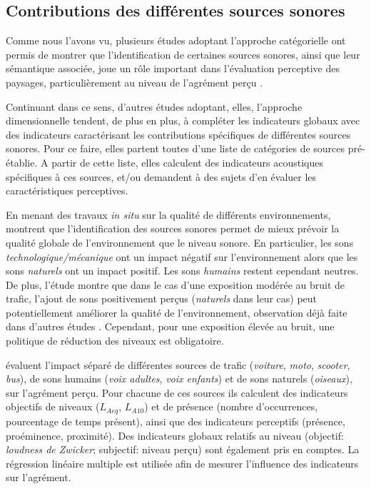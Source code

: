 \subsection{Contributions des différentes sources sonores}
\label{sec:ch3_contribSource}

Comme nous l'avons vu, plusieurs études adoptant l'approche catégorielle ont permis de montrer que l'identification de certaines sources sonores, ainsi que leur sémantique associée, joue un rôle important dans l'évaluation perceptive des paysages, particulièrement au niveau de l'agrément perçu \citep{defreville2004aactivity,guastavino2006ideal,nilsson2007soundscape,szeremeta2009analysis,gozalo2015relationship}.

Continuant dans ce sens, d'autres études adoptant, elles, l'approche dimensionnelle tendent, de plus en plus, à compléter les indicateurs globaux avec des indicateurs caractérisant les contributions spécifiques de différentes sources sonores. Pour ce faire, elles partent toutes d'une liste de catégories de sources pré-établie. A partir de cette liste, elles calculent des indicateurs acoustiques spécifiques à ces sources, et/ou demandent à des sujets d'en évaluer les caractéristiques perceptives.

En menant des travaux \emph{in situ} sur la qualité de différents environnements, \citep{nilsson2007acoustic,nilsson2007soundscape} montrent que l'identification des sources sonores permet de mieux prévoir la qualité globale de l'environnement que le niveau sonore. En particulier, les sons \emph{technologique/mécanique} ont un impact négatif sur l'environnement alors que les sons \emph{naturels} ont un impact positif. Les sons \emph{humains} restent cependant neutres. De plus, l'étude montre que dans le cas d'une exposition modérée au bruit de trafic, l'ajout de sons positivement perçus (\emph{naturels} dans leur cas) peut potentiellement améliorer la qualité de l'environnement, observation déjà faite dans d'autres études \citep{hong2013designing,galbrun2012perceptual}. Cependant, pour une exposition élevée au bruit, une politique de réduction des niveaux est obligatoire.

\citep{defreville2004aactivity,lavandier2006contribution} évaluent l'impact séparé de différentes sources de trafic (\emph{voiture}, \emph{moto}, \emph{scooter}, \emph{bus}), de sons humains (\emph{voix adultes}, \emph{voix enfants}) et de sons naturels (\emph{oiseaux}), sur l'agrément perçu. Pour chacune de ces sources ils calculent des indicateurs objectifs de niveaux ($L_{Aeq}$, $L_{A10}$) et de présence (nombre d’occurrences, pourcentage de temps présent), ainsi que des indicateurs perceptifs (présence, proéminence, proximité). Des indicateurs globaux relatifs au niveau (objectif: \emph{loudness de Zwicker}; subjectif: niveau perçu) sont également pris en comptes. La régression linéaire multiple est utilisée afin de mesurer l'influence des indicateurs sur l'agrément.

